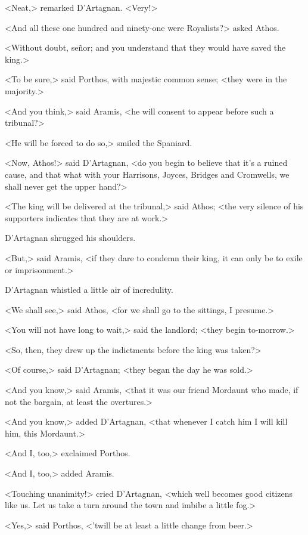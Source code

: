 <Neat,> remarked D'Artagnan. <Very!>

<And all these one hundred and ninety-one were Royalists?> asked Athos.

<Without doubt, señor; and you understand that they would have saved the king.>

<To be sure,> said Porthos, with majestic common sense; <they were in the majority.>

<And you think,> said Aramis, <he will consent to appear before such a tribunal?>

<He will be forced to do so,> smiled the Spaniard.

<Now, Athos!> said D'Artagnan, <do you begin to believe that it's a ruined cause, and that what with your Harrisons, Joyces, Bridges and Cromwells, we shall never get the upper hand?>

<The king will be delivered at the tribunal,> said Athos; <the very silence of his supporters indicates that they are at work.>

D'Artagnan shrugged his shoulders.

<But,> said Aramis, <if they dare to condemn their king, it can only be to exile or imprisonment.>

D'Artagnan whistled a little air of incredulity.

<We shall see,> said Athos, <for we shall go to the sittings, I presume.>

<You will not have long to wait,> said the landlord; <they begin to-morrow.>

<So, then, they drew up the indictments before the king was taken?>

<Of course,> said D'Artagnan; <they began the day he was sold.>

<And you know,> said Aramis, <that it was our friend Mordaunt who made, if not the bargain, at least the overtures.>

<And you know,> added D'Artagnan, <that whenever I catch him I will kill him, this Mordaunt.>

<And I, too,> exclaimed Porthos.

<And I, too,> added Aramis.

<Touching unanimity!> cried D'Artagnan, <which well becomes good citizens like us. Let us take a turn around the town and imbibe a little fog.>
\begin{a4}
\enlargethispage{\baselineskip}
\end{a4}

<Yes,> said Porthos, <'twill be at least a little change from beer.> 